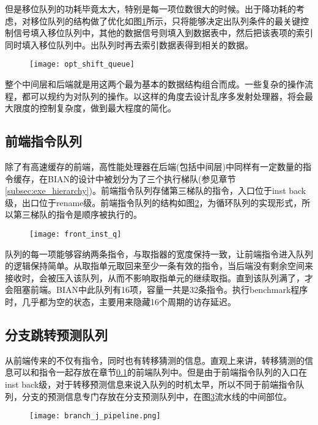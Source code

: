 但是移位队列的功耗毕竟太大，特别是每一项位数很大的时候。出于降功耗的考虑，对移位队列的结构做了优化如图\ref{fig:opt_shift_q}所示，只将能够决定出队列条件的最关键控制信号填入移位队列中，其他的数据信号则填入到数据表中，然后把该表项的索引同时填入移位队列中。出队列时再去索引数据表得到相关的数据。
\begin{figure}[!htbp]
	\centering
	\texttt{[image: opt\_shift\_queue]}
	\label{fig:opt_shift_q}
\end{figure}


整个中间层和后端就是用这两个最为基本的数据结构组合而成。一些复杂的操作流程，都可以规约为对队列的操作。以这样的角度去设计乱序多发射处理器，将会最大限度的控制复杂度，做到最大程度的简化。

\subsection{前端指令队列}\label{subsec:frontq}
除了有高速缓存的前端，高性能处理器在后端(包括中间层)中同样有一定数量的指令缓存，在BIAN的设计中被划分为了三个执行梯队(参见章节\ref{subsec:exe_hierarchy})。前端指令队列存储第三梯队的指令，入口位于inst back级，出口位于rename级。前端指令队列的结构如图\ref{fig:front_q}，为循环队列的实现形式，所以第三梯队的指令是顺序被执行的。
\begin{figure}[!htbp]
	\centering
	\texttt{[image: front\_inst\_q]}
	\label{fig:front_q}
\end{figure}

队列的每一项能够容纳两条指令，与取指器的宽度保持一致，让前端指令进入队列的逻辑保持简单。从取指单元取回来至少一条有效的指令，当后端没有剩余空间来接收时，会被压入该队列，从而不影响取指单元的继续取指。直到该队列满了，才会阻塞前端。BIAN中此队列有16项，容量一共是32条指令。执行benchmark程序时，几乎都为空的状态，主要用来隐藏16个周期的访存延迟。

\subsection{分支跳转预测队列}

从前端传来的不仅有指令，同时也有转移猜测的信息。直观上来讲，转移猜测的信息可以和指令一起存放在章节\ref{subsec:frontq}的前端队列中。但是由于前端指令队列的入口在inst back级，对于转移预测信息来说入队列的时机太早，所以不同于前端指令队列，分支的预测信息专门存放在分支预测队列中，在图\ref{fig:predict_q}流水线的中间部位。
\begin{figure}[!htbp]
	\centering
	\texttt{[image: branch\_j\_pipeline.png]}
	\label{fig:predict_q}
\end{figure}

